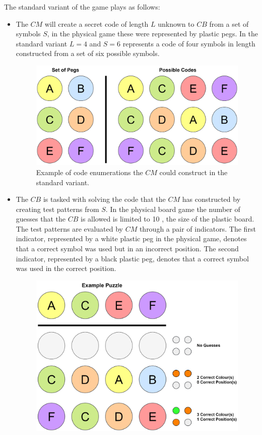 \documentclass[12pt]{article}  %
\theoremstyle{definition}
\theoremstyle{remark}
\begin{document}
The standard variant of the game plays as follows:
\begin {itemize}
	\item {The $CM$ will create a secret code of length $L$ unknown to $CB$ from a set of symbols $S$, in the physical game these were represented by plastic pegs. In the standard variant $L=4$ and $S=6$  represents a code of four symbols in length constructed from a set of six possible symbols.}
	\begin{figure}[H]
	\centering
	\includegraphics[scale=0.75]{pegs}
	\caption{ Example of code enumerations the $CM$ could construct in the standard variant.}
	\end{figure}
	\item {The $CB$ is tasked with solving the code that the $CM$ has constructed by creating test patterns from $S$. In the physical board game the number of guesses that the $CB$ is allowed is limited to 10 \cite {Nelson}, the size of the plastic board. The test patterns are evaluated by $CM$ through a pair of indicators. The first indicator, represented by a white plastic peg in the physical game, denotes that a correct symbol was used but in an incorrect position. The second indicator, represented by a black plastic peg, denotes that a correct symbol was used in the correct position.}
	\begin{figure}[H]
	\centering
	\includegraphics[scale=0.75]{guesses}

\end{figure}
\end{itemize}
\end{document}
